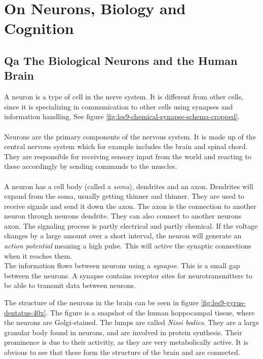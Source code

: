 \documentclass{article}
\begin{document}
\section{On Neurons, Biology and Cognition} %

\subsection{Qa The Biological Neurons and the Human Brain}
A neuron is a type of cell in the nerve system. It is different from other cells, since it is specializing in communication to other cells using synapses and information handling. See figure \ref{fig:les9-chemical-synapse-schema-cropped}.
\\ \\
Neurons are the primary components of the nervous system. It is made up of the central nervous system which for example includes the brain and spinal chord. They are responsible for receiving sensory input from the world and reacting to these accordingly by sending commands to the muscles. 
\\ \\
A neuron has a cell body (called a \textit{soma}), dendrites and an axon. Dendrites will expand from the soma, usually getting thinner and thinner. They are used to receive signals and send it down the axon. The axon is the connection to another neuron through neurons dendrite. They can also connect to another neurons axon. The signaling process is partly electrical and partly chemical. If the voltage changes by a large amount over a short interval, the neuron will generate an \textit{action potential} meaning a high pulse. This will active the synaptic connections when it reaches them. 
\\
The information flows between neurons using a \textit{synapse}. This is a small gap between the neurons. A synapse contains receptor sites for neurotransmitters to be able to transmit data between neurons.



The structure of the neurons in the brain can be seen in figure \ref{fig:les9-gyrus-dentatus-40x}. The figure is a snapshot of the human hoppocampal tissue, where the neurons are Golgi-stained. The lumps are called \textit{Nissi bodies}. They are a large granular body found in neurons, and are involved in protein synthesis. Their prominence is due to their activitiy, as they are very metabolically active. It is obvious to see that these form the structure of the brain and are connected.
\end{document}

